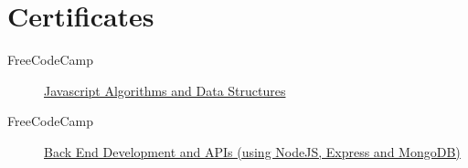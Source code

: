 \documentclass[a4paper,10pt]{article}
\begin{document}
\section{Certificates}
\begin{description}
    \item[FreeCodeCamp]
        \href{https://www.freecodecamp.org/certification/jaydamani/javascript-algorithms-and-data-structures}{
            Javascript Algorithms and Data Structures
        }
    \item[FreeCodeCamp]
        \href{https://www.freecodecamp.org/certification/jaydamani/back-end-development-and-apis}{
            Back End Development and APIs (using NodeJS, Express and MongoDB)
        }
\end{description}
\end{document}
